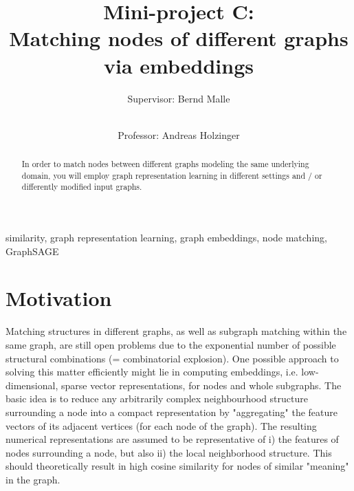 \documentclass[review]{elsarticle}
\begin{document}
\begin{frontmatter}

\title{Mini-project C: \\ Matching nodes of different graphs via embeddings}

\author[TUG,MUG]{Supervisor: Bernd Malle}
\author[TUG,MUG]{\small \\Professor: Andreas Holzinger}

\address[TUG]{Graz University of Technology, Austria}
\address[MUG]{Medical University Graz, Austria}


\begin{abstract}

In order to match nodes between different graphs modeling the same underlying domain, you will employ graph representation learning in different settings and / or differently modified input graphs.

\end{abstract}

\begin{keyword}
similarity, graph representation learning, graph embeddings, node matching, GraphSAGE
\end{keyword}

\end{frontmatter}


\section{Motivation}
\label{sect:motivation}

Matching structures in different graphs, as well as subgraph matching within the same graph, are still open problems due to the exponential number of possible structural combinations (= combinatorial explosion). One possible approach to solving this matter efficiently might lie in computing embeddings, i.e. low-dimensional, sparse vector representations, for nodes and whole subgraphs. The basic idea is to reduce any arbitrarily complex neighbourhood structure surrounding a node into a compact representation by "aggregating" the feature vectors of its adjacent vertices (for each node of the graph). The resulting numerical representations are assumed to be representative of i) the features of nodes surrounding a node, but also ii) the local neighborhood structure. This should theoretically result in high cosine similarity for nodes of similar "meaning" in the graph.
\end{document}
